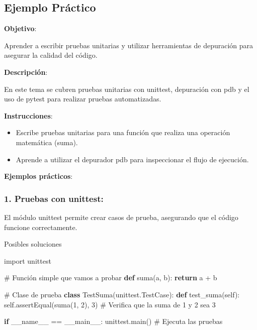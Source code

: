 \documentclass[
  a4paper,
  DIV=11,
  numbers=noendperiod,
  onepage,
  openany]{scrreprt}
\newenvironment{Shaded}{\begin{snugshade}}{\end{snugshade}}
\newcommand{\CommentTok}[1]{\textcolor[rgb]{0.37,0.37,0.37}{#1}}
\newcommand{\ControlFlowTok}[1]{\textcolor[rgb]{0.00,0.23,0.31}{\textbf{#1}}}
\newcommand{\DecValTok}[1]{\textcolor[rgb]{0.68,0.00,0.00}{#1}}
\newcommand{\ImportTok}[1]{\textcolor[rgb]{0.00,0.46,0.62}{#1}}
\newcommand{\KeywordTok}[1]{\textcolor[rgb]{0.00,0.23,0.31}{\textbf{#1}}}
\newcommand{\NormalTok}[1]{\textcolor[rgb]{0.00,0.23,0.31}{#1}}
\newcommand{\OperatorTok}[1]{\textcolor[rgb]{0.37,0.37,0.37}{#1}}
\newcommand{\StringTok}[1]{\textcolor[rgb]{0.13,0.47,0.30}{#1}}
\newcommand{\VariableTok}[1]{\textcolor[rgb]{0.07,0.07,0.07}{#1}}
\begin{document}
\subsection{Ejemplo Práctico}\label{ejemplo-pruxe1ctico-10}

\textbf{Objetivo}:

Aprender a escribir pruebas unitarias y utilizar herramientas de
depuración para asegurar la calidad del código.

\textbf{Descripción}:

En este tema se cubren pruebas unitarias con unittest, depuración con
pdb y el uso de pytest para realizar pruebas automatizadas.

\textbf{Instrucciones}:

\begin{itemize}
\item
  Escribe pruebas unitarias para una función que realiza una operación
  matemática (suma).
\item
  Aprende a utilizar el depurador pdb para inspeccionar el flujo de
  ejecución.
\end{itemize}

\textbf{Ejemplos prácticos}:

\subsubsection{1. Pruebas con unittest:}\label{pruebas-con-unittest}

El módulo unittest permite crear casos de prueba, asegurando que el
código funcione correctamente.

Posibles soluciones

\begin{Shaded}
\begin{Highlighting}[]
\ImportTok{import}\NormalTok{ unittest}

\CommentTok{\# Función simple que vamos a probar}
\KeywordTok{def}\NormalTok{ suma(a, b):}
    \ControlFlowTok{return}\NormalTok{ a }\OperatorTok{+}\NormalTok{ b}

\CommentTok{\# Clase de prueba}
\KeywordTok{class}\NormalTok{ TestSuma(unittest.TestCase):}
    \KeywordTok{def}\NormalTok{ test\_suma(}\VariableTok{self}\NormalTok{):}
        \VariableTok{self}\NormalTok{.assertEqual(suma(}\DecValTok{1}\NormalTok{, }\DecValTok{2}\NormalTok{), }\DecValTok{3}\NormalTok{)  }\CommentTok{\# Verifica que la suma de 1 y 2 sea 3}

\ControlFlowTok{if} \VariableTok{\_\_name\_\_} \OperatorTok{==} \StringTok{\textquotesingle{}\_\_main\_\_\textquotesingle{}}\NormalTok{:}
\NormalTok{    unittest.main()  }\CommentTok{\# Ejecuta las pruebas}
\end{Highlighting}
\end{Shaded}
\end{document}

